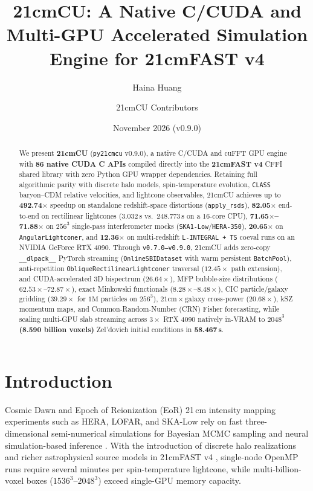 \documentclass[11pt,twocolumn]{article}
\title{\textbf{21cmCU}: A Native C/CUDA and Multi-GPU Accelerated Simulation Engine for 21cmFAST v4}
\author{Haina Huang \and 21cmCU Contributors}
\date{November 2026 (v0.9.0)}
\begin{document}
\maketitle

\begin{abstract}
We present \textbf{21cmCU} (\texttt{py21cmcu} v0.9.0), a native C/CUDA and cuFFT GPU engine with \textbf{86 native CUDA C APIs} compiled directly into the \textbf{21cmFAST v4} CFFI shared library with zero Python GPU wrapper dependencies. Retaining full algorithmic parity with discrete halo models, spin-temperature evolution, \texttt{CLASS} baryon--CDM relative velocities, and lightcone observables, 21cmCU achieves up to \textbf{492.74$\times$} speedup on standalone redshift-space distortions (\texttt{apply\_rsds}), \textbf{82.05$\times$} end-to-end on rectilinear lightcones (3.032\,s vs.\ 248.773\,s on a 16-core CPU), \textbf{71.65$\times$--71.88$\times$} on $256^3$ single-pass interferometer mocks (\texttt{SKA1-Low}/\texttt{HERA-350}), \textbf{20.65$\times$} on \texttt{AngularLightconer}, and \textbf{12.36$\times$} on multi-redshift \texttt{L-INTEGRAL + TS} coeval runs on an NVIDIA GeForce RTX 4090. Through \texttt{v0.7.0--v0.9.0}, 21cmCU adds zero-copy \texttt{\_\_dlpack\_\_} PyTorch streaming (\texttt{OnlineSBIDataset} with warm persistent \texttt{BatchPool}), anti-repetition \texttt{ObliqueRectilinearLightconer} traversal ($12.45\times$ path extension), and CUDA-accelerated 3D bispectrum ($26.64\times$), MFP bubble-size distributions ($62.53\times$--$72.87\times$), exact Minkowski functionals ($8.28\times$--$8.48\times$), CIC particle/galaxy gridding ($39.29\times$ for $1\text{M}$ particles on $256^3$), $21\text{cm} \times \text{galaxy}$ cross-power ($20.68\times$), kSZ momentum maps, and Common-Random-Number (CRN) Fisher forecasting, while scaling multi-GPU slab streaming across $3\times$ RTX 4090 natively in-VRAM to \textbf{$2048^3$ (8.590 billion voxels)} Zel'dovich initial conditions in \textbf{58.467\,s}.
\end{abstract}

\section{Introduction}
Cosmic Dawn and Epoch of Reionization (EoR) 21\,cm intensity mapping experiments such as HERA, LOFAR, and SKA-Low rely on fast three-dimensional semi-numerical simulations for Bayesian MCMC sampling \cite{Mesinger2011,Greig2015,Murray2020} and neural simulation-based inference \cite{Cranmer2020}. With the introduction of discrete halo realizations and richer astrophysical source models in 21cmFAST v4 \cite{Davies2025}, single-node OpenMP runs require several minutes per spin-temperature lightcone, while multi-billion-voxel boxes ($1536^3$--$2048^3$) exceed single-GPU memory capacity.
\end{document}
